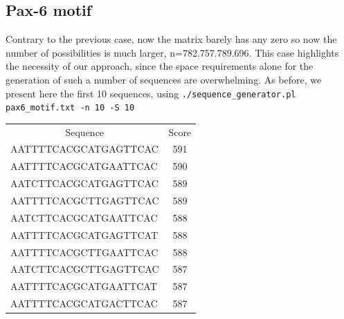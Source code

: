\documentclass[10pt]{article}
\begin{document}
\subsection{Pax-6 motif} 
Contrary to the previous case, now the matrix barely has any zero so now the number of possibilities is much larger, n=782.757.789.696. This case highlights the necessity of our approach, since the space requirements alone for the generation of such a number of sequences are overwhelming. As before, we present here the first 10 sequences, using \verb|./sequence_generator.pl pax6_motif.txt -n 10 -S 10|
\begin{table}[h]
\centering
\begin{tabular}{lc}
\multicolumn{1}{c}{Sequence} & Score \\
AATTTTCACGCATGAGTTCAC        & 591   \\
AATTTTCACGCATGAATTCAC        & 590   \\
AATCTTCACGCATGAGTTCAC        & 589   \\
AATTTTCACGCTTGAGTTCAC        & 589   \\
AATCTTCACGCATGAATTCAC        & 588   \\
AATTTTCACGCATGAGTTCAT        & 588   \\
AATTTTCACGCTTGAATTCAC        & 588   \\
AATCTTCACGCTTGAGTTCAC        & 587   \\
AATTTTCACGCATGAATTCAT        & 587   \\
AATTTTCACGCATGACTTCAC        & 587  
\end{tabular}
\end{table}
\end{document}
